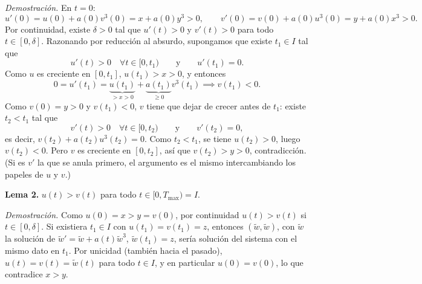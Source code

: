 {    \textit{Demostración.} En $t = 0$:
    \[
        u'(0) = u(0) + a(0) v^3(0) = x + a(0) y^3 > 0, \qquad
        v'(0) = v(0) + a(0) u^3(0) = y + a(0) x^3 > 0.
    \]
    Por continuidad, existe $\delta > 0$ tal que $u'(t) > 0$ y $v'(t) > 0$ para todo $t \in [0, \delta]$. Razonando por reducción al absurdo, supongamos que existe $t_1 \in I$ tal que
    \[
        u'(t) > 0 \quad \forall t \in [0, t_1) \qquad \text{y} \qquad u'(t_1) = 0.
    \]
    Como $u$ es creciente en $[0, t_1]$, $u(t_1) > x > 0$, y entonces
    \[
        0 = u'(t_1) = \underbrace{u(t_1)}_{> x > 0} + \underbrace{a(t_1)}_{\geq 0} v^3(t_1) \implies v(t_1) < 0.
    \]
    Como $v(0) = y > 0$ y $v(t_1) < 0$, $v$ tiene que dejar de crecer antes de $t_1$: existe $t_2 < t_1$ tal que
    \[
        v'(t) > 0 \quad \forall t \in [0, t_2) \qquad \text{y} \qquad v'(t_2) = 0,
    \]
    es decir, $v(t_2) + a(t_2) u^3(t_2) = 0$. Como $t_2 < t_1$, se tiene $u(t_2) > 0$, luego $v(t_2) < 0$. Pero $v$ es creciente en $[0, t_2]$, así que $v(t_2) > y > 0$, contradicción. (Si es $v'$ la que se anula primero, el argumento es el mismo intercambiando los papeles de $u$ y $v$.)
    \begin{center}
    \end{center}

    \textbf{Lema 2.} $u(t) > v(t)$ para todo $t \in [0, T_{\max}) = I$.

    \textit{Demostración.} Como $u(0) = x > y = v(0)$, por continuidad $u(t) > v(t)$ si $t \in [0, \delta]$. Si existiera $t_1 \in I$ con $u(t_1) = v(t_1) = z$, entonces $(\tilde w, \tilde w)$, con $\tilde w$ la solución de $\tilde w' = \tilde w + a(t) \tilde w^3$, $\tilde w(t_1) = z$, sería solución del sistema con el mismo dato en $t_1$. Por unicidad (también hacia el pasado), $u(t) = v(t) = \tilde w(t)$ para todo $t \in I$, y en particular $u(0) = v(0)$, lo que contradice $x > y$.

}
